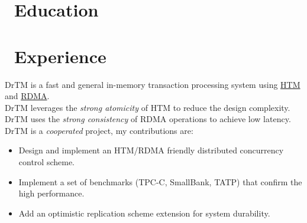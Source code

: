 \documentclass{resume}
\begin{document}



\section{\faGraduationCap\ Education}

\section{\faUsers\ Experience}
DrTM is a fast and general in-memory transaction processing system using \underline{HTM} and \underline{RDMA}.
\\[2pt]
DrTM leverages the \textit{strong atomicity} of HTM to reduce the design complexity.
\\[2pt]
DrTM uses the \textit{strong consistency} of RDMA operations to achieve low latency.
\\[2pt]
DrTM is a \textit{cooperated} project, my contributions are:
\begin{itemize}
  \item {Design and implement an HTM/RDMA friendly distributed concurrency control scheme.}
  \item {Implement a set of benchmarks (TPC-C, SmallBank, TATP) that confirm the high performance.}
  \item {Add an optimistic replication scheme extension for system durability.}
\end{itemize}
\end{document}
